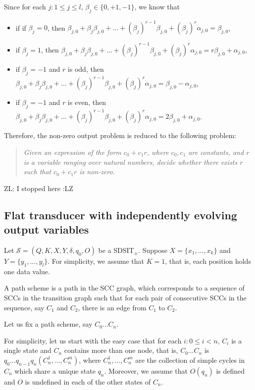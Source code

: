 \documentclass[runningheads,a4paper]{llncs}
\def\Ss{{\mathcal{S} }}
\newcommand{\zhilin}[1]{\color{cyan} {ZL: #1 :LZ} \color{black}}
\newcommand{\SDSIT}{SDSIT}
\begin{document}
Since for each $j: 1 \le j \le l$, $\beta_j \in \{0,+1,-1\}$, we know that 
\begin{itemize}
\item if if $\beta_j=0$, then $\beta_{j,0} + \beta_{j} \beta_{j,0} + \dots + (\beta_j)^{r-1} \beta_{j,0} + (\beta_j)^r \alpha_{j,0}=\beta_{j,0}$,
%
\item if $\beta_j=1$, then $\beta_{j,0} + \beta_{j} \beta_{j,0} + \dots + (\beta_j)^{r-1} \beta_{j,0} + (\beta_j)^r \alpha_{j,0}=r\beta_{j,0} + \alpha_{j,0}$,
%
\item if $\beta_j = -1$ and $r$ is odd, then $\beta_{j,0} + \beta_{j} \beta_{j,0} + \dots + (\beta_j)^{r-1} \beta_{j,0} + (\beta_j)^r \alpha_{j,0}= \beta_{j,0} - \alpha_{j,0}$,

\item if $\beta_j = -1$ and $r$ is even, then $\beta_{j,0} + \beta_{j} \beta_{j,0} + \dots + (\beta_j)^{r-1} \beta_{j,0} + (\beta_j)^r \alpha_{j,0}= 2\beta_{j,0} + \alpha_{j,0}$.
\end{itemize}

Therefore, the non-zero output problem is reduced to the following problem: 
\begin{quote}
\it Given an expression of the form $c_0+c_1 r$, where $c_0 ,c_1$ are constants, and $r$ is a variable ranging over natural numbers, decide whether there exists $r$ such that $c_0+ c_1 r$ is non-zero. 
\end{quote}

\zhilin{I stopped here}


\subsection{Flat transducer with independently evolving output variables}

Let $\Ss=(Q, K, X, Y, \delta, q_0, O)$ be a \SDSIT$_{\pm}$. Suppose $X=\{x_1,\dots,x_k\}$ and $Y=\{y_1,\dots,y_l\}$. For simplicity, we assume that $K = 1$, that is, each position holds one data value.

A path scheme is a path in the SCC graph, which corresponds to a sequence of SCCs in the transition graph such that for each pair of consecutive SCCs in the sequence, say $C_1$ and $C_2$, there is an edge from $C_1$ to $C_2$.

Let us fix a path scheme, say $C_0 \dots C_n$.

For simplicity, let us start with the easy case that for each $i: 0 \le i < n$, $C_i$ is a single state and $C_n$ contains more than one node, that is, $C_0 \dots C_n$ is $q_0 \dots q_{n-1} q_n (C^1_n,\dots,C^m_n)$, where $C^1_{n},\dots, C^m_n$ are the collection of simple cycles in $C_n$ which share a unique state $q_{n}$. Moreover, we assume that $O(q_n)$ is defined and $O$ is undefined in each of the other states of $C_n$.
\end{document}

